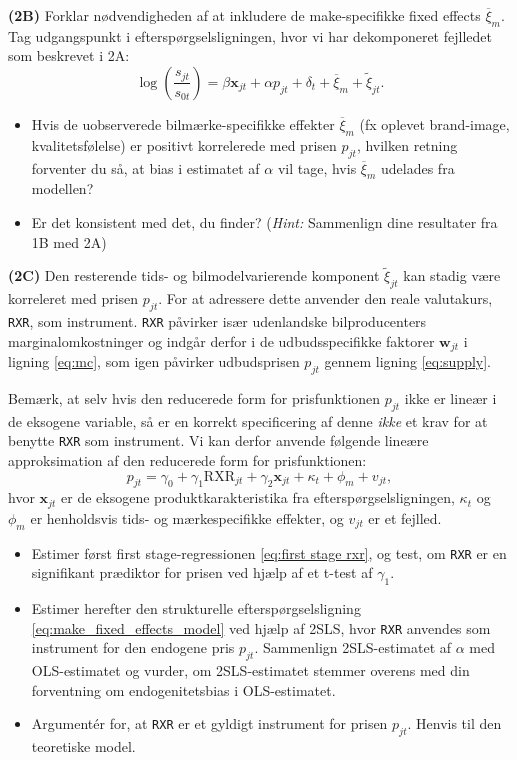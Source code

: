\documentclass[a4paper,12pt]{article}
\begin{document}
\bigskip 

\noindent \textbf{(2B)} Forklar nødvendigheden af at inkludere de make-specifikke fixed effects $\overline \xi_m$. Tag udgangspunkt i efterspørgselsligningen, hvor vi har dekomponeret fejlledet som beskrevet i 2A:
    $$
    \log\left(\frac{s_{jt}}{s_{0t}}\right) = \beta \mathbf{x}_{jt} + \alpha p_{jt} + \delta_t + \overline \xi_m +  \tilde \xi_{jt}.
    $$

\begin{itemize}
    \item Hvis de uobserverede bilmærke-specifikke effekter $\overline \xi_m$ (fx oplevet brand-image, kvalitetsfølelse) er positivt korrelerede med prisen $p_{jt}$, hvilken retning forventer du så, at bias i estimatet af $\alpha$ vil tage, hvis $\overline \xi_m$ udelades fra modellen?
    \item Er det konsistent med det, du finder? (\textit{Hint:} Sammenlign dine resultater fra 1B med 2A)
\end{itemize}
\hrulefill
\bigskip 

\noindent \textbf{(2C)} Den resterende tids- og bilmodelvarierende komponent \( \tilde{\xi}_{jt} \) kan stadig være korreleret med prisen \( p_{jt} \). For at adressere dette anvender \cite{grieco2024evolution} den reale valutakurs, \texttt{RXR}, som instrument. \texttt{RXR} påvirker især udenlandske bilproducenters marginalomkostninger og indgår derfor i de udbudsspecifikke faktorer \( \mathbf{w}_{jt} \) i ligning \eqref{eq:mc}, som igen påvirker udbudsprisen \( p_{jt} \) gennem ligning \eqref{eq:supply}.

Bemærk, at selv hvis den reducerede form for prisfunktionen \( p_{jt} \) ikke er lineær i de eksogene variable, så er en korrekt specificering af denne \textit{ikke} et krav for at benytte \texttt{RXR} som instrument. Vi kan derfor anvende følgende lineære approksimation af den reducerede form for prisfunktionen:
\begin{equation}
    p_{jt} = \gamma_0 + \gamma_1 \text{RXR}_{jt} + \gamma_2 \mathbf{x}_{jt} + \kappa_{t} + \phi_{m} + v_{jt}, \label{eq:first stage rxr}
\end{equation}
hvor \( \mathbf{x}_{jt} \) er de eksogene produktkarakteristika fra efterspørgselsligningen, \( \kappa_t \) og \( \phi_m \) er henholdsvis tids- og mærkespecifikke effekter, og $v_{jt}$ er et fejlled. 

\begin{itemize}
    \item Estimer først first stage-regressionen \eqref{eq:first stage rxr}, og test, om \texttt{RXR} er en signifikant prædiktor for prisen ved hjælp af et t-test af \( \gamma_1 \).
    \item  Estimer herefter den strukturelle efterspørgselsligning \eqref{eq:make_fixed_effects_model} ved hjælp af 2SLS, hvor \texttt{RXR} anvendes som instrument for den endogene pris \( p_{jt} \). Sammenlign 2SLS-estimatet af \( \alpha \) med OLS-estimatet og vurder, om 2SLS-estimatet stemmer overens med din forventning om endogenitetsbias i OLS-estimatet.
    \item Argumentér for, at \texttt{RXR} er et gyldigt instrument for prisen \( p_{jt} \). Henvis til den teoretiske model.
\end{itemize}
\end{document}
